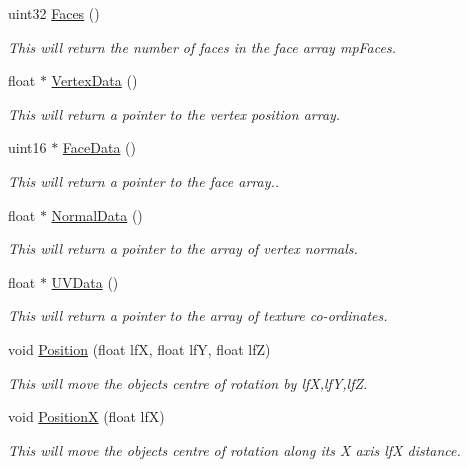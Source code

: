 \begin{DoxyCompactItemize}
uint32 \hyperlink{classc_mesh_a5f1b578685730d581301f3b5dbb2f83c}{Faces} ()
\begin{DoxyCompactList}\small\item\em This will return the number of faces in the face array mpFaces. \item\end{DoxyCompactList}\item 
float $\ast$ \hyperlink{classc_mesh_a22dfd977d522b15185837426b444d7b7}{VertexData} ()
\begin{DoxyCompactList}\small\item\em This will return a pointer to the vertex position array. \item\end{DoxyCompactList}\item 
uint16 $\ast$ \hyperlink{classc_mesh_a49725e65f20af64f20442389fe616282}{FaceData} ()
\begin{DoxyCompactList}\small\item\em This will return a pointer to the face array.. \item\end{DoxyCompactList}\item 
float $\ast$ \hyperlink{classc_mesh_a65a3a31f9d6b718b7ea161f434f2b3da}{NormalData} ()
\begin{DoxyCompactList}\small\item\em This will return a pointer to the array of vertex normals. \item\end{DoxyCompactList}\item 
float $\ast$ \hyperlink{classc_mesh_a20b38f2c9a4646b8aa2e81210b4136c5}{UVData} ()
\begin{DoxyCompactList}\small\item\em This will return a pointer to the array of texture co-\/ordinates. \item\end{DoxyCompactList}\item 
void \hyperlink{classc_mesh_a022d36f1b2f456b5edb50d32956960e0}{Position} (float lfX, float lfY, float lfZ)
\begin{DoxyCompactList}\small\item\em This will move the objects centre of rotation by lfX,lfY,lfZ. \item\end{DoxyCompactList}\item 
void \hyperlink{classc_mesh_a4d0f5cbdb12f1bc7fb8899c61d2328d5}{PositionX} (float lfX)
\begin{DoxyCompactList}\small\item\em This will move the objects centre of rotation along its X axis lfX distance. \item\end{DoxyCompactList}\item 

\end{DoxyCompactItemize}
